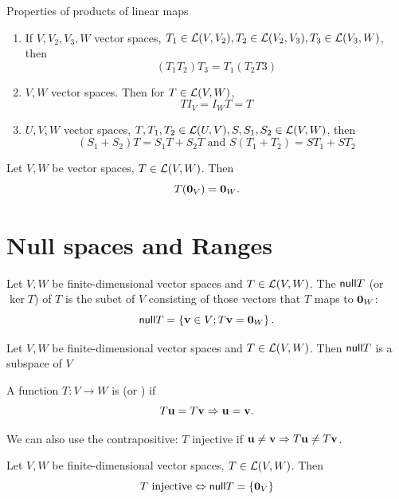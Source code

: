 \documentclass[aspectratio=169]{beamer}
\begin{document}
\begin{frame}{Properties of products of linear maps}
\begin{theorem}
\begin{enumerate}
\item {} If $V,V_2,V_3,W$ vector spaces, $T_1\in\mathcal{L}(V,V_2),T_2\in\mathcal{L}(V_2,V_3),T_3\in\mathcal{L}(V_3,W)$, then
\[
(T_1T_2)T_3=T_1(T_2T3)
\]
\item {} $V,W$ vector spaces. Then for $T\in\mathcal{L}(V,W)$,
\[
TI_V=I_WT=T
\]
\item {} $U,V,W$ vector spaces, $T,T_1,T_2\in\mathcal{L}(U,V),S,S_1,S_2\in\mathcal{L}(V,W)$, then
\[
(S_1+S_2)T=S_1T+S_2T\textrm{ and }S(T_1+T_2)=ST_1+ST_2
\]
\end{enumerate}
\end{theorem}
\end{frame}


\begin{frame}
\begin{theorem}
Let $V,W$ be vector spaces, $T\in\mathcal{L}(V,W)$. Then
\[
T(\b0_V)=\b0_W.
\]
\end{theorem}
\end{frame}


\section{Null spaces and Ranges}


\begin{frame}
\begin{definition}
Let $V,W$ be finite-dimensional vector spaces and $T\in\mathcal{L}(V,W)$. The  $\mathsf{null} T$ (or  $\ker T$) of $T$ is the subet of $V$ consisting of those vectors that $T$ maps to $\b0_W$:
\[
\nullspace T=\left\{\bv\in V; T\bv=\b0_W \right\}.
\]
\end{definition}
\begin{importanttheorem}
Let $V,W$ be finite-dimensional vector spaces and $T\in\mathcal{L}(V,W)$.
Then $\mathsf{null} T$ is a subspace of $V$
\end{importanttheorem}
\end{frame}


\begin{frame}
\begin{definition}[Injectivity]
A function $T:V\to W$ is  (or ) if
\[
T\mathbf{u}=T\mathbf{v} \Rightarrow \mathbf{u}=\mathbf{v}.
\]
\end{definition}
We can also use the contrapositive: $T$ injective if $\mathbf{u}\neq \mathbf{v}\Rightarrow T\mathbf{u}\neq T\mathbf{v}$.
\begin{importanttheorem}
Let $V,W$ be finite-dimensional vector spaces, $T\in\mathcal{L}(V,W)$. Then 
\[
T\textrm{ injective}\Leftrightarrow \nullspace T=\{\b0_V\}
\]
\end{importanttheorem}
\end{frame}
\end{document}
